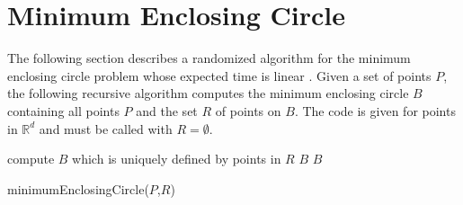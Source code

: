 \documentclass[a4paper, 11pt]{article}
\begin{document}
\appendix
\section{Minimum Enclosing Circle}

The following section describes a randomized algorithm for the minimum
enclosing circle problem whose expected time is linear
\cite{Welzl1991}.  Given a set of points $P$, the following recursive
algorithm computes the minimum enclosing circle $B$ containing all
points $P$ and the set $R$ of points on $B$. The code is given for
points in $\mathbb{R}^d$ and must be called with $R=\emptyset$.


\begin{algorithm}[Hhtbp]
      {compute $B$ which is uniquely
        defined by  points in $R$\;
        \Return $B$\;
      }
  \Return $B$
  
  \caption{minimumEnclosingCircle($P$,$R$)}
  \label{algo:main}
\end{algorithm}






\end{document}
